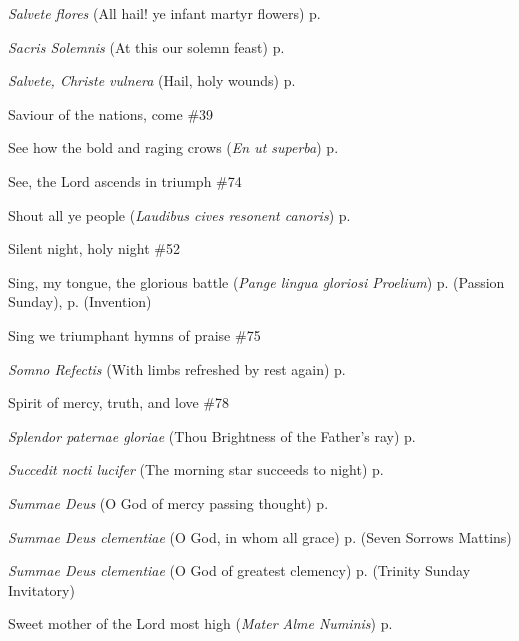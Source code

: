 \begin{hangparas}{1.25em}{1}
\par\noindent
\textit{Salvete flores} (All hail! ye infant martyr flowers) \dotfill p. \pageref{HolyInnocentsMattins}
\par\noindent
\textit{Sacris Solemnis} (At this our solemn feast) \dotfill p. \pageref{CorpusChristiInvitatory}
\par\noindent
\textit{Salvete, Christe vulnera} (Hail, holy wounds) \dotfill p. \pageref{PreciousBloodMattins}
\par\noindent
Saviour of the nations, come \dotfill \#39
\par\noindent
See how the bold and raging crows (\textit{En ut superba}) \dotfill p. \pageref{CompassionInvitatory}
\par\noindent
See, the Lord ascends in triumph \dotfill \#74
\par\noindent
Shout all ye people (\textit{Laudibus cives resonent canoris}) \dotfill p. \pageref{BenedictEvensong}
\par\noindent
Silent night, holy night \dotfill \#52
\par\noindent
Sing, my tongue, the glorious battle (\textit{Pange lingua gloriosi Proelium}) \dotfill p. \pageref{PassionSundayInvitatory} (Passion Sunday), p. \pageref{InventionInvitatory} (Invention)
\par\noindent
Sing we triumphant hymns of praise \dotfill \#75
\par\noindent
\textit{Somno Refectis} (With limbs refreshed by rest again) \dotfill p. \pageref{MondayInvitatory}
\par\noindent
Spirit of mercy, truth, and love \dotfill \#78
\par\noindent
\textit{Splendor paternae gloriae} (Thou Brightness of the Father's ray) \dotfill p. \pageref{MondayMattinsWinter}
\par\noindent
\textit{Succedit nocti lucifer} (The morning star succeeds to night) \dotfill p. \pageref{AnneMattins}
\par\noindent
\textit{Summae Deus} (O God of mercy passing thought) \dotfill p. \pageref{SaturdayInvitatory}
\par\noindent
\textit{Summae Deus clementiae} (O God, in whom all grace) \dotfill p. \pageref{SevenSorrowsMattins} (Seven Sorrows Mattins)
\par\noindent
\textit{Summae Deus clementiae} (O God of greatest clemency) \dotfill p. \pageref{TrinityInvitatory} (Trinity Sunday Invitatory)
\par\noindent
Sweet mother of the Lord most high (\textit{Mater Alme Numinis}) \dotfill p. \pageref{MotherhoodMattins}

\end{hangparas}
